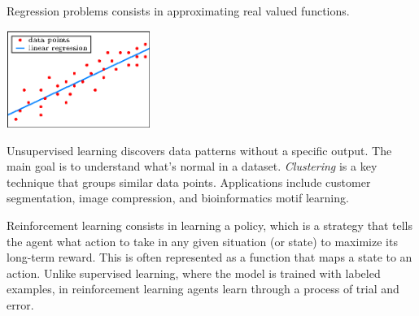 \documentclass[10pt, letterpaper]{report}
\begin{document}
Regression problems consists in approximating real valued functions.
\begin{center}
     \includegraphics[width=0.35\textwidth]{images/regression.eps}
\end{center}
Unsupervised learning discovers data patterns without a specific output. The main goal is to understand what's normal in a dataset. \textit{Clustering} is a key technique that groups similar data points. Applications include customer segmentation, image compression, and bioinformatics motif learning.\bigskip

Reinforcement learning consists in learning a policy, which is a strategy that tells the agent what action to take in any given situation (or state) to maximize its long-term reward. This is often represented as a function that maps a state to an action. Unlike supervised learning, where the model is trained with labeled examples, in reinforcement learning agents learn through a process of trial and error.\bigskip
\end{document}
